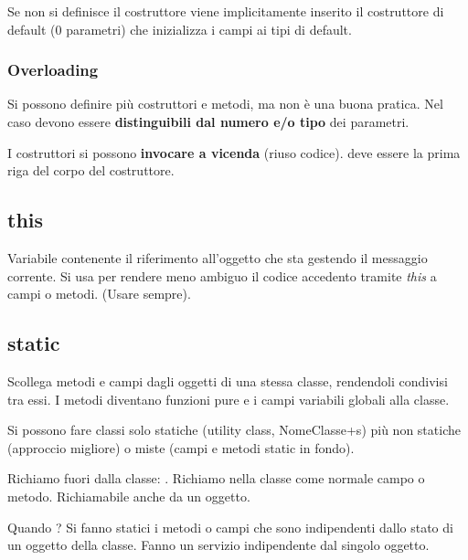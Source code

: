 
Se non si definisce il costruttore viene implicitamente inserito il costruttore di default (0 parametri) che inizializza i campi ai tipi di default.

\subsubsection{Overloading}
Si possono definire più costruttori e metodi, ma non è una buona pratica.
Nel caso devono essere \textbf{distinguibili dal numero e/o tipo} dei parametri.

I costruttori si possono \textbf{invocare a vicenda} (riuso codice).  deve essere la prima riga del corpo del costruttore.


\subsection{this}
Variabile contenente il riferimento all'oggetto che sta gestendo il messaggio corrente. Si usa per rendere meno ambiguo il codice accedento tramite \textit{this} a campi o metodi. (Usare sempre).

\subsection{static}
Scollega metodi e campi dagli oggetti di una stessa classe, rendendoli condivisi tra essi. I metodi diventano funzioni pure e i campi variabili globali alla classe.

Si possono fare classi solo statiche (utility class, NomeClasse+s) più non statiche (approccio migliore) o miste (campi e metodi static in fondo).

Richiamo fuori dalla classe: .
Richiamo nella classe come normale campo o metodo.
Richiamabile anche da un oggetto.


Quando ?
Si fanno statici i metodi o campi che sono indipendenti dallo stato di un oggetto della classe. Fanno un servizio indipendente dal singolo oggetto.

